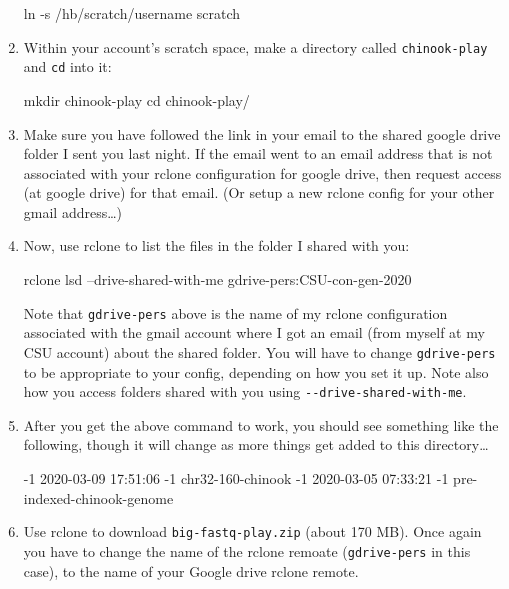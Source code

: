 \documentclass[]{krantz}
\makeatletter
\newenvironment{Shaded}{\begin{snugshade}}{\end{snugshade}}
\newcommand{\BuiltInTok}[1]{#1}
\newcommand{\ExtensionTok}[1]{#1}
\newcommand{\FunctionTok}[1]{\textcolor[rgb]{0,0,0}{#1}}
\newcommand{\NormalTok}[1]{#1}
\newenvironment{kframe}{%
\medskip{}
\setlength{\fboxsep}{.8em}
 \def\at@end@of@kframe{}%
 \ifinner\ifhmode%
  \def\at@end@of@kframe{\end{minipage}}%
  \begin{minipage}{\columnwidth}%
 \fi\fi%
 \def\FrameCommand##1{\hskip\@totalleftmargin \hskip-\fboxsep
 \colorbox{shadecolor}{##1}\hskip-\fboxsep
     \hskip-\linewidth \hskip-\@totalleftmargin \hskip\columnwidth}%
 \MakeFramed {\advance\hsize-\width
   \@totalleftmargin\z@ \linewidth\hsize
   \@setminipage}}%
 {\par\unskip\endMakeFramed%
 \at@end@of@kframe}
\renewenvironment{Shaded}{\begin{kframe}}{\end{kframe}}
\makeatother
\begin{document}
\begin{enumerate}
\begin{Shaded}
\begin{Highlighting}[]
\FunctionTok{ln}\NormalTok{ -s /hb/scratch/username scratch}
\end{Highlighting}
\end{Shaded}
\item
  Within your account's scratch space, make a directory called \texttt{chinook-play} and \texttt{cd} into it:

\begin{Shaded}
\begin{Highlighting}[]
\FunctionTok{mkdir}\NormalTok{ chinook-play}
\BuiltInTok{cd}\NormalTok{ chinook-play/}
\end{Highlighting}
\end{Shaded}
\item
  Make sure you have followed the link in your email to the shared google drive folder I sent you last night. If the email
  went to an email address that is not associated with your rclone configuration for google drive, then request access
  (at google drive) for that email. (Or setup a new rclone config for your other gmail address\ldots{})
\item
  Now, use rclone to list the files in the folder I shared with you:

\begin{Shaded}
\begin{Highlighting}[]
\ExtensionTok{rclone}\NormalTok{ lsd --drive-shared-with-me gdrive-pers:CSU-con-gen-2020}
\end{Highlighting}
\end{Shaded}

  Note that \texttt{gdrive-pers} above is the name of my rclone configuration associated with the gmail account where
  I got an email (from myself at my CSU account) about the shared folder. You will have to change \texttt{gdrive-pers}
  to be appropriate to your config, depending on how you set it up. Note also how you access folders shared with
  you using \texttt{-\/-drive-shared-with-me}.
\item
  After you get the above command to work, you should see something like the following, though it
  will change as more things get added to this directory\ldots{}

\begin{Shaded}
\begin{Highlighting}[]
\ExtensionTok{-1}\NormalTok{ 2020-03-09 17:51:06        -1 chr32-160-chinook}
\ExtensionTok{-1}\NormalTok{ 2020-03-05 07:33:21        -1 pre-indexed-chinook-genome}
\end{Highlighting}
\end{Shaded}
\item
  Use rclone to download \texttt{big-fastq-play.zip} (about 170 MB). Once again you have to change
  the name of the rclone remoate (\texttt{gdrive-pers} in this case), to the name of your Google drive
  rclone remote.


\end{enumerate}
\end{document}
